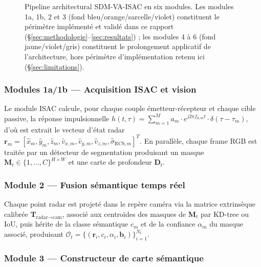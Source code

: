 \documentclass[12pt,a4paper,titlepage]{article}
\begin{document}
\begin{figure}[H]
{%
}
\caption{Pipeline architectural SDM-VA-ISAC en six modules. Les modules 1a, 1b, 2 et 3 (fond bleu/orange/sarcelle/violet) constituent le périmètre implémenté et validé dans ce rapport (\S\ref{sec:methodologie}--\ref{sec:resultats}) ; les modules 4 à 6 (fond jaune/violet/gris) constituent le prolongement applicatif de l'architecture, hors périmètre d'implémentation retenu ici (\S\ref{sec:limitations}).}
\label{fig:prop_arch}
\end{figure}

\subsubsection{Modules 1a/1b --- Acquisition ISAC et vision}

Le module ISAC calcule, pour chaque couple émetteur-récepteur et chaque cible passive, la réponse impulsionnelle $h(t,\tau) = \sum_{m=1}^{M} a_m \cdot e^{j2\pi f_{d,m} t} \cdot \delta(\tau-\tau_m)$, d'où est extrait le vecteur d'état radar $\mathbf{r}_m = [\hat{x}_m,\hat{y}_m,\hat{z}_m,\hat{v}_{x,m},\hat{v}_{y,m},\hat{v}_{z,m},\hat{\sigma}_{\text{RCS},m}]^T$. En parallèle, chaque frame RGB est traitée par un détecteur de segmentation produisant un masque $\mathbf{M}_t \in \{1,\ldots,C\}^{H\times W}$ et une carte de profondeur $\mathbf{D}_t$.

\subsubsection{Module 2 --- Fusion sémantique temps réel}

Chaque point radar est projeté dans le repère caméra via la matrice extrinsèque calibrée $\mathbf{T}_{\text{radar}\to\text{cam}}$, associé aux centroïdes des masques de $\mathbf{M}_t$ par KD-tree ou IoU, puis hérite de la classe sémantique $c_m$ et de la confiance $\alpha_m$ du masque associé, produisant $\mathcal{O}_t = \{(\mathbf{r}_i,c_i,\alpha_i,\mathbf{b}_i)\}_{i=1}^{N_t}$.

\subsubsection{Module 3 --- Constructeur de carte sémantique}
\end{document}
